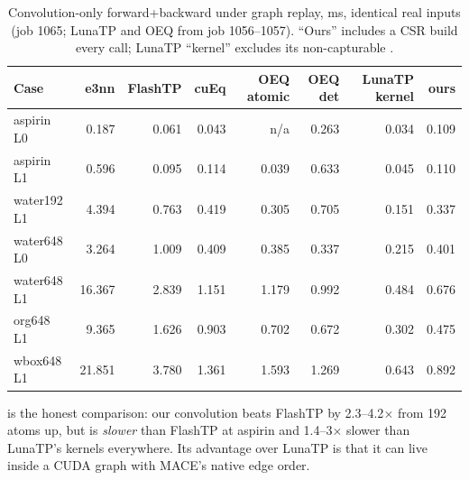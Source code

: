\begin{table}[h]
\centering
\caption{Convolution-only forward+backward under graph replay, ms, identical real inputs (job 1065; LunaTP and OEQ from job 1056--1057). ``Ours'' includes a CSR build every call; LunaTP ``kernel'' excludes its non-capturable .}
\label{tab:convonly}
\small
\begin{tabular}{lrrrrrrr}
\toprule
Case & e3nn & FlashTP & cuEq & OEQ atomic & OEQ det & LunaTP kernel & \textbf{ours} \\
\midrule
aspirin L0 & 0.187 & 0.061 & 0.043 & n/a & 0.263 & 0.034 & 0.109 \\
aspirin L1 & 0.596 & 0.095 & 0.114 & 0.039 & 0.633 & 0.045 & 0.110 \\
water192 L1 & 4.394 & 0.763 & 0.419 & 0.305 & 0.705 & 0.151 & 0.337 \\
water648 L0 & 3.264 & 1.009 & 0.409 & 0.385 & 0.337 & 0.215 & 0.401 \\
water648 L1 & 16.367 & 2.839 & 1.151 & 1.179 & 0.992 & 0.484 & 0.676 \\
org648 L1 & 9.365 & 1.626 & 0.903 & 0.702 & 0.672 & 0.302 & 0.475 \\
wbox648 L1 & 21.851 & 3.780 & 1.361 & 1.593 & 1.269 & 0.643 & 0.892 \\
\bottomrule
\end{tabular}
\end{table}

 is the honest comparison: our convolution beats FlashTP by 2.3--4.2$\times$ from 192 atoms up, but is \emph{slower} than FlashTP at aspirin and 1.4--3$\times$ slower than LunaTP's kernels everywhere. Its advantage over LunaTP is that it can live inside a CUDA graph with MACE's native edge order.

